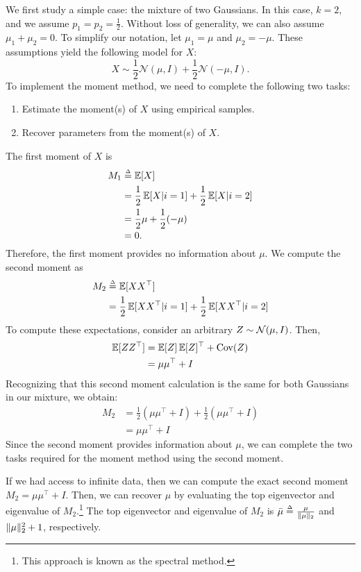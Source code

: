 We first study a simple case: the mixture of two Gaussians.
In this case, $k=2$, and we assume $p_1=p_2=\frac{1}{2}$. Without loss of generality, we can also assume $\mu_1+\mu_2=0$. To simplify our notation, let $\mu_1=\mu$ and $\mu_2=-\mu$. These assumptions yield the following model for $X$: 
\begin{equation}
    X \sim \frac{1}{2}\mathcal{N}(\mu,I) + \frac{1}{2}\mathcal{N}(-\mu,I).
\end{equation}
To implement the moment method, we need to complete the following two tasks:
\begin{enumerate}
    \item Estimate the moment(s) of $X$ using empirical samples.
    \item Recover parameters from the moment(s) of $X$.
\end{enumerate}

The first moment of $X$ is
\begin{align}
    M_1 &\defeq \Exp [X] \\
    &= \frac{1}{2}\Exp [X|i=1]+\frac{1}{2}\Exp[X|i=2] \\
    &= \frac{1}{2}\mu + \frac{1}{2}(-\mu) \\
    &= 0.
\end{align}
Therefore, the first moment provides no information about $\mu$. We compute the second moment as
\begin{align}
    M_2 &\defeq \Exp[XX^\top] \\
    &= \frac{1}{2}\Exp[XX^\top|i=1]+\frac{1}{2}\Exp[XX^\top|i=2]
\end{align}
To compute these expectations, consider an arbitrary $Z \sim \mathcal N(\mu, I)$. Then,
\begin{align}
    \operatorname*{\mathbb{E}} [ZZ^\top] &= \operatorname*{\mathbb{E}}[Z] \operatorname*{\mathbb{E}}[Z]^\top + \operatorname{Cov}(Z) \\
    &= \mu \mu^\top + I
\end{align}
Recognizing that this second moment calculation is the same for both Gaussians in our mixture, we obtain:
\begin{align}
    M_2 &= \frac{1}{2}(\mu\mu^\top+I)+\frac{1}{2}(\mu\mu^\top+I) \\
    &=\mu\mu^\top+I
\end{align}
Since the second moment provides information about $\mu$, we can complete the two tasks required for the moment method using the second moment.

If we had access to infinite data, then we can compute the exact second moment $M_2=\mu\mu^\top+I$. Then, we can recover $\mu$ by evaluating the top eigenvector and eigenvalue of $M_2$.\footnote{This approach is known as the spectral method.} The top eigenvector and eigenvalue of $M_2$ is $\bar{\mu} \defeq \frac{\mu}{\norm{\mu}_2}$ and $\|\mu\|_2^2+1$, respectively. 

